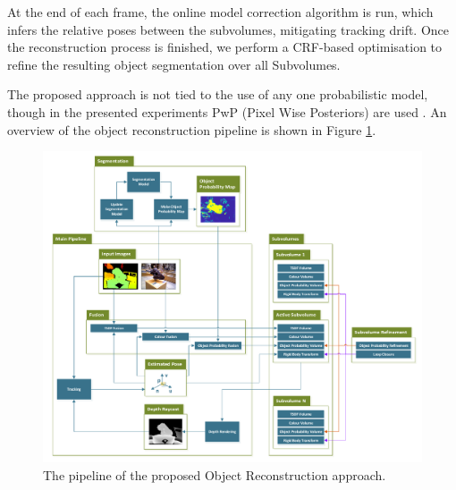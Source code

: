 At the end of each frame, the online model correction algorithm is run, which
infers the relative poses between the subvolumes, mitigating tracking drift.
Once the reconstruction process is finished, we perform a CRF-based optimisation
to refine the resulting object segmentation over all Subvolumes.

The proposed approach is not tied to the use of any one probabilistic model,
though in the presented experiments PwP (Pixel Wise Posteriors) are used
\cite{Bibby2008}. An overview of the object reconstruction pipeline is shown in
Figure \ref{fig:probobj_pipeline_diagram}.

\begin{figure}[ht]
  \label{fig:probobj_pipeline_diagram}
  \centering
  \includegraphics[width=\linewidth]{figures/object_recon/pipeline.pdf}
  \caption{The pipeline of the proposed Object Reconstruction approach.}
\end{figure}

